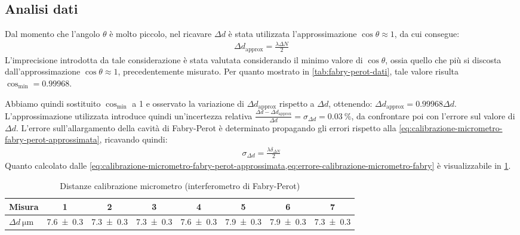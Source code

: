 \documentclass[a4paper]{article}
\begin{document}
\subsection{Analisi dati}
Dal momento che l'angolo $\theta$ è molto piccolo, nel ricavare $\Delta d$ è stata utilizzata l'approssimazione $\cos{\theta}\approx1$, da cui consegue:
\begin{align}
    \Delta d_{\text{approx}} = \frac{\lambda \Delta N}{2}
\label{eq:calibrazione-micrometro-fabry-perot-approssimata}
\end{align}
L'imprecisione introdotta da tale considerazione è stata valutata considerando il minimo valore di $\cos{\theta}$, ossia quello che più si discosta dall'approssimazione $\cos{\theta}\approx1$, precedentemente misurato. Per quanto mostrato in \cref{tab:fabry-perot-dati}, tale valore risulta $\cos_{\min}=\num{0.99968}$.

Abbiamo quindi sostituito $\cos_{\min}$ a 1 e osservato la variazione di $\Delta d_{\text{approx}}$ rispetto a $\Delta d$, ottenendo: $\Delta d_{\text{approx}} = \num{0.99968}\Delta d$. L'approssimazione utilizzata introduce quindi un'incertezza relativa $\frac{\Delta d- \Delta d_{\text{approx}}}{\Delta d}=\sigma_{\Delta d}=\SI{0.03}{\percent}$, da confrontare poi con l'errore sul valore di $\Delta d$.
L'errore sull'allargamento della cavità di Fabry-Perot è determinato propagando gli errori rispetto alla \cref{eq:calibrazione-micrometro-fabry-perot-approssimata}, ricavando quindi:
\begin{align}
   \sigma_{\Delta d}= \frac{\lambda \delta_{\Delta N}}{2}
\label{eq:errore-calibrazione-micrometro-fabry}
\end{align}
Quanto calcolato dalle \cref{eq:calibrazione-micrometro-fabry-perot-approssimata,eq:errore-calibrazione-micrometro-fabry} è visualizzabile in \cref{tab:distanze-calibrazione-fabry-perot}.

\begin{table}[htbp]
\centering
\caption{Distanze calibrazione micrometro (interferometro di Fabry-Perot)}
\begin{tabular}{|l|ccccccc|}
\hline
Misura & 1 & 2 & 3 & 4 & 5 & 6 & 7 \\\hline\hline
$\Delta d \SI{}{\micro\meter}$ & \SI{7.6 \pm 0.3}{} & \SI{7.3 \pm 0.3}{} & \SI{7.3 \pm 0.3}{} & \SI{7.6 \pm 0.3}{} & \SI{7.9 \pm 0.3}{} & \SI{7.9 \pm 0.3}{} & \SI{7.3 \pm 0.3}{} \\\hline
\end{tabular}
\label{tab:distanze-calibrazione-fabry-perot}
\end{table}
\end{document}

